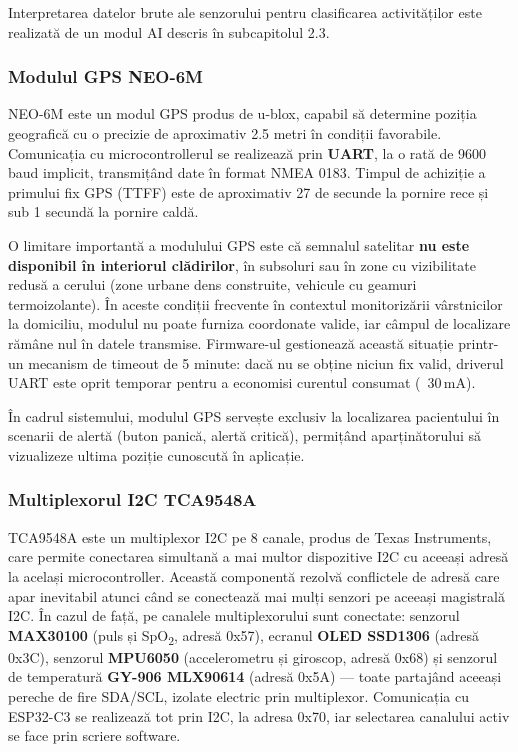 ﻿\documentclass[12pt,a4paper,twoside]{article}
\newcommand{\spo}{SpO\textsubscript{2}}
\begin{document}
Interpretarea datelor brute ale senzorului pentru clasificarea activităților este realizată de un modul AI descris în subcapitolul 2.3.

\subsubsection{Modulul GPS NEO-6M}

NEO-6M este un modul GPS produs de u-blox, capabil să determine poziția geografică cu o precizie de aproximativ 2.5 metri în condiții favorabile. Comunicația cu microcontrollerul se realizează prin \textbf{UART}, la o rată de 9600 baud implicit, transmițând date în format NMEA 0183. Timpul de achiziție a primului fix GPS (TTFF) este de aproximativ 27 de secunde la pornire rece și sub 1 secundă la pornire caldă.

O limitare importantă a modulului GPS este că semnalul satelitar \textbf{nu este disponibil în interiorul clădirilor}, în subsoluri sau în zone cu vizibilitate redusă a cerului (zone urbane dens construite, vehicule cu geamuri termoizolante). În aceste condiții frecvente în contextul monitorizării vârstnicilor la domiciliu, modulul nu poate furniza coordonate valide, iar câmpul de localizare rămâne nul în datele transmise. Firmware-ul gestionează această situație printr-un mecanism de timeout de 5 minute: dacă nu se obține niciun fix valid, driverul UART este oprit temporar pentru a economisi curentul consumat (~30\,mA).

În cadrul sistemului, modulul GPS servește exclusiv la localizarea pacientului în scenarii de alertă (buton panică, alertă critică), permițând aparținătorului să vizualizeze ultima poziție cunoscută în aplicație.

\subsubsection{Multiplexorul I2C TCA9548A}

TCA9548A este un multiplexor I2C pe 8 canale, produs de Texas Instruments, care permite conectarea simultană a mai multor dispozitive I2C cu aceeași adresă la același microcontroller. Această componentă rezolvă conflictele de adresă care apar inevitabil atunci când se conectează mai mulți senzori pe aceeași magistrală I2C. În cazul de față, pe canalele multiplexorului sunt conectate: senzorul \textbf{MAX30100} (puls și \spo, adresă 0x57), ecranul \textbf{OLED SSD1306} (adresă 0x3C), senzorul \textbf{MPU6050} (accelerometru și giroscop, adresă 0x68) și senzorul de temperatură \textbf{GY-906 MLX90614} (adresă 0x5A) — toate partajând aceeași pereche de fire SDA/SCL, izolate electric prin multiplexor. Comunicația cu ESP32-C3 se realizează tot prin I2C, la adresa 0x70, iar selectarea canalului activ se face prin scriere software.
\end{document}
